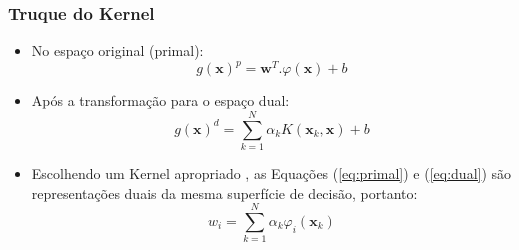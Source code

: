 \documentclass{beamer}
\begin{document}
\begin{frame}
	\frametitle{Truque do Kernel}
	\begin{itemize}
		\item No espaço original (primal):
		\begin{equation}
	 		g(\textbf{x})^p = \textbf{w}^T.\varphi(\textbf{x}) + b
	 		\label{eq:primal}
		\end{equation}
		\item Após a transformação para o espaço dual:
		\begin{equation}
			g(\textbf{x})^d = \sum_{k=1}^{N} \alpha_kK(\textbf{x}_k,\textbf{x}) + b
	 		\label{eq:dual}
		\end{equation}
		\item Escolhendo um Kernel apropriado \cite{mercer}, as Equações (\ref{eq:primal}) e (\ref{eq:dual}) são representações duais da mesma superfície de decisão, portanto:
		\begin{equation}
		 	w_i = \sum_{k=1}^{N} \alpha_k\varphi_i(\textbf{x}_k)
			\label{eq:rela}
		\end{equation}
	\end{itemize}
\end{frame}
\end{document}
